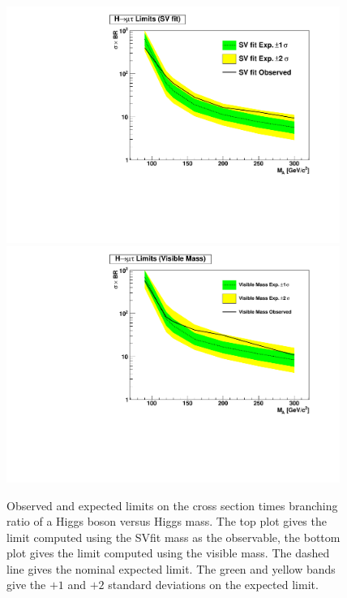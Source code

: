%
\begin{figure}[t]
\begin{center}
  \includegraphics*[width=0.97\textwidth]{results_chapter/figures/expected_vs_obs_SVfit.pdf}
  \includegraphics*[width=0.97\textwidth]{results_chapter/figures/expected_vs_obs_VisibleMass.pdf}
  \caption[Observed and expected limits on Higgs $\sigma \times \text{BR}$]
  {Observed and expected limits on the cross section times branching ratio of a
  Higgs boson versus Higgs mass.  The top plot gives the limit computed using
  the SVfit mass as the observable, the bottom plot gives the limit computed
  using the visible mass.  The dashed line gives the nominal expected limit.
  The green and yellow bands give the $+1$ and $+2$ standard deviations on the
  expected limit.  } \label{fig:SVXSecLimits}
\end{center}
\end{figure} 
